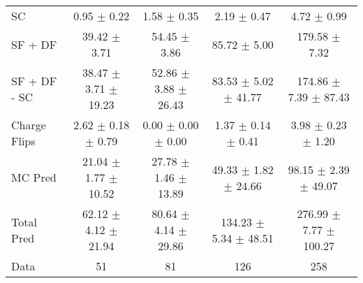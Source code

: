 \begin{tabular}{l|cccc}
                                 SC &  0.95 $\pm$  0.22 &  1.58 $\pm$  0.35 &  2.19 $\pm$  0.47 &  4.72 $\pm$  0.99 \\
                            SF + DF & 39.42 $\pm$  3.71 & 54.45 $\pm$  3.86 & 85.72 $\pm$  5.00 & 179.58 $\pm$  7.32 \\
\hline
                       SF + DF - SC & 38.47 $\pm$  3.71 $\pm$ 19.23 & 52.86 $\pm$  3.88 $\pm$ 26.43 & 83.53 $\pm$  5.02 $\pm$ 41.77 & 174.86 $\pm$  7.39 $\pm$ 87.43 \\
\hline\hline
                       Charge Flips &  2.62 $\pm$  0.18 $\pm$  0.79 &  0.00 $\pm$  0.00 $\pm$  0.00 &  1.37 $\pm$  0.14 $\pm$  0.41 &  3.98 $\pm$  0.23 $\pm$  1.20 \\
\hline
                            MC Pred & 21.04 $\pm$  1.77 $\pm$ 10.52 & 27.78 $\pm$  1.46 $\pm$ 13.89 & 49.33 $\pm$  1.82 $\pm$ 24.66 & 98.15 $\pm$  2.39 $\pm$ 49.07 \\
\hline
                         Total Pred & 62.12 $\pm$  4.12 $\pm$ 21.94 & 80.64 $\pm$  4.14 $\pm$ 29.86 & 134.23 $\pm$  5.34 $\pm$ 48.51 & 276.99 $\pm$  7.77 $\pm$ 100.27 \\
\hline\hline
                               Data &    51 &    81 &   126 &   258 \\
\hline\hline
\end{tabular}


